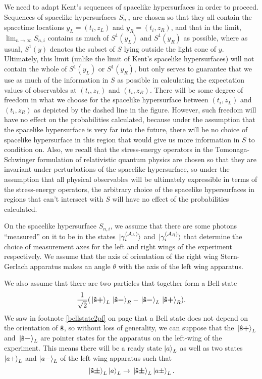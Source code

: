 We need to adapt Kent's sequences of spacelike hypersurfaces in order to proceed.  Sequences of spacelike hypersurfaces $S_{n,i}$ are chosen so that they all contain the spacetime locations $y_L=(t_i, z_L)$ and $y_R=(t_i,z_R)$, and that in the limit, $\lim_{n\rightarrow\infty}S_{n,i}$ contains as much of $S^1(y_L)$ and $S^1(y_R)$ as possible, where as usual, $S^1(y)$ denotes the subset of $S$ lying outside the light cone of $y$. Ultimately, this limit (unlike the limit of Kent's spacelike hypersurfaces) will not contain the whole of $S^1(y_L)$ or $S^1(y_R)$, but only serves to guarantee that we use as much of the information in $S$ as possible in calculating the expectation values of observables at $(t_i, z_L)$ and $(t_i,z_R)$. There will be some degree of freedom in what we choose for the spacelike hypersurface between $(t_i, z_L)$ and $(t_i,z_R)$ as depicted by the dashed line in the figure. However, such freedom will have no effect on the probabilities calculated, because under the assumption that the spacelike hypersurface is very far into the future, there will be no choice of spacelike hypersurface in this region that would give us more information in $S$ to condition on. Also, we recall that the stress-energy operators in the Tomonaga-Schwinger formulation of relativistic quantum physics are chosen so that they are invariant under perturbations of the spacelike hypersurface, so under the assumption that all physical observables will be ultimately expressible in terms of the stress-energy operators, the arbitrary choice of the spacelike hypersurfaces in regions that can't intersect with $S$ will have no effect of the probabilities calculated. 

On the spacelike hypersurface $S_{n,i}$, we assume that there are some photons ``measured'' on it to be in the states $\ket*{\gamma_i^{(\mathcal{A}_L)}}$ and $\ket*{\gamma_i^{(\mathcal{A}_R)}}$ that determine the choice of measurement axes for the left and right wings of the experiment respectively.  We assume that the axis of orientation of the right wing Stern-Gerlach apparatus makes an angle $\theta$ with the axis of the left wing apparatus.

We also assume that there are two particles that together form a Bell-state \begin{equation}\label{bellstatePI}
	\frac{1}{\sqrt{2}}(\ket*{\vb{\hat{{s}}}\bm{+}}_L\ket*{\vb{\hat{{s}}}\bm{-}}_R-\ket*{\vb{\hat{{s}}}\bm{-}}_L\ket*{\vb{\hat{{s}}}\bm{+}}_R).
\end{equation}
We saw  in footnote \ref{bellstate2pf} on page \pageref{bellstate2pf} that a Bell state does not depend on the orientation of $\vb{\hat{{s}}}$, so without loss of generality, we can suppose that the $\ket*{\vb{\hat{{s}}}\bm{+}}_L$ and $\ket*{\vb{\hat{{s}}}\bm{-}}_L$ are pointer states for the apparatus on the left-wing of the experiment. This means there will be a ready state $\ket{a}_L$  as well as two states $\ket{a+}_L$ and $\ket{a-}_L$ of the left wing apparatus such that 
$$\ket*{\vb{\hat{{s}}}\bm{\pm}}_L\ket{a}_L\rightarrow\ket*{\vb{\hat{{s}}}\bm{\pm}}_L\ket{a\pm}_L.$$


